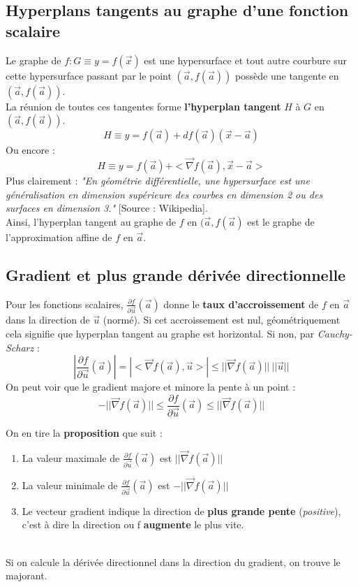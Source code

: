 \documentclass	[11pt, a4paper, openany]{book}
\begin{document}
\subsection{Hyperplans tangents au graphe d'une fonction scalaire}
Le graphe de $f : G \equiv y = f(\vec{x})$ est une hypersurface et tout autre courbure sur cette hypersurface passant par le point $(\vec{a},f(\vec{a}))$ possède une tangente en $(\vec{a},f(\vec{a}))$.\\
La réunion de toutes ces tangentes forme \textbf{l'hyperplan tangent} $H$ à $G$ en $(\vec{a},f(\vec{a}))$.
$$H \equiv y = f(\vec{a}) + df(\vec{a})(\vec{x} - \vec{a})$$
Ou encore : 
$$H \equiv y = f(\vec{a}) + <\vec{\nabla}f(\vec{a}), \vec{x} - \vec{a}>$$
Plus clairement : \textit{"En géométrie différentielle, une hypersurface est une généralisation en dimension supérieure des courbes en dimension 2 ou des surfaces en dimension 3."} [Source : Wikipedia].\\

Ainsi, l'hyperplan tangent au graphe de $f$ en $(\vec{a}, f(\vec{a})$ est le graphe de l'approximation affine de $f$ en $\vec{a}$.

\subsection{Gradient et plus grande dérivée directionnelle}
Pour les fonctions scalaires, $\frac{\partial f}{\partial\vec{u}}(\vec{a})$ donne le \textbf{taux d'accroissement} de $f$ en $\vec{a}$ dans la direction de $\vec{u}$ (normé). Si cet accroissement est nul, géométriquement cela signifie que hyperplan tangent au graphe est horizontal. Si non, par \textit{Cauchy-Scharz} :
$$|\frac{\partial f}{\partial\vec{u}}(\vec{a})| = |<\vec{\nabla}f(\vec{a}), \vec{u}>| \leq ||\vec{\nabla}f(\vec{a})||\ ||\vec{u}||$$
On peut voir que le gradient majore et minore la pente à un point :
$$- ||\vec{\nabla}f(\vec{a})|| \leq \frac{\partial f}{\partial\vec{u}}(\vec{a}) \leq ||\vec{\nabla}f(\vec{a})||$$

On en tire la \textbf{proposition} que suit : 
\begin{enumerate}
\item La valeur maximale de $\frac{\partial f}{\partial\vec{u}}(\vec{a})$ est $||\vec{\nabla}f(\vec{a})||$
\item La valeur minimale de $\frac{\partial f}{\partial\vec{u}}(\vec{a})$ est $-||\vec{\nabla}f(\vec{a})||$
\item Le vecteur gradient indique la direction de \textbf{plus grande pente} (\textit{positive}), c'est à dire la direction ou f \textbf{augmente} le plus vite.
\end{enumerate}
\ \\
Si on calcule la dérivée directionnel dans la direction du gradient, on trouve le majorant.
\end{document}
